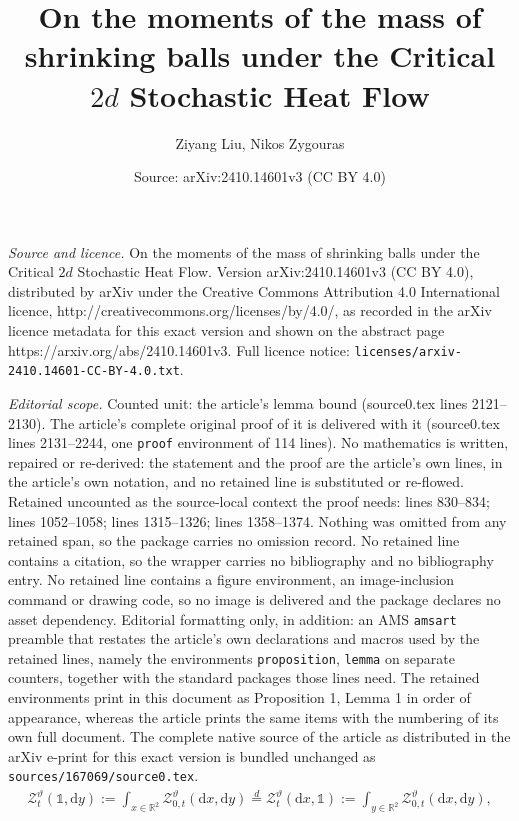 \documentclass[10pt,a4paper]{amsart}
\title{On the moments of the mass of shrinking balls under the Critical $2d$ Stochastic Heat Flow}
\author{Ziyang Liu, Nikos Zygouras}
\date{Source: arXiv:2410.14601v3 (CC BY 4.0)}
\newcommand{\R}{\mathbb{R}}
\newcommand\dd{\mathrm{d}}
\newcommand{\ind}{\mathds{1}}
\renewcommand{\theta}{\vartheta}
\begin{document}
\maketitle

\noindent\emph{Source and licence.} On the moments of the mass of shrinking balls under the Critical $2d$ Stochastic Heat Flow. Version arXiv:2410.14601v3 (CC BY 4.0), distributed by arXiv under the Creative Commons Attribution 4.0 International licence, http://creativecommons.org/licenses/by/4.0/, as recorded in the arXiv licence metadata for this exact version and shown on the abstract page https://arxiv.org/abs/2410.14601v3. Full licence notice: \texttt{licenses/arxiv-2410.14601-CC-BY-4.0.txt}.\par\smallskip

\noindent\textit{Editorial scope.} Counted unit: the article's lemma bound (source0.tex lines 2121--2130). The article's complete original proof of it is delivered with it (source0.tex lines 2131--2244, one \texttt{proof} environment of 114 lines). No mathematics is written, repaired or re-derived: the statement and the proof are the article's own lines, in the article's own notation, and no retained line is substituted or re-flowed.  Retained uncounted as the source-local context the proof needs: lines 830--834; lines 1052--1058; lines 1315--1326; lines 1358--1374.  Nothing was omitted from any retained span, so the package carries no omission record.  No retained line contains a citation, so the wrapper carries no bibliography and no bibliography entry.  No retained line contains a figure environment, an image-inclusion command or drawing code, so no image is delivered and the package declares no asset dependency.  Editorial formatting only, in addition: an AMS \texttt{amsart} preamble that restates the article's own declarations and macros used by the retained lines, namely the environments \texttt{proposition}, \texttt{lemma} on separate counters, together with the standard packages those lines need.  The retained environments print in this document as Proposition 1, Lemma 1 in order of appearance, whereas the article prints the same items with the numbering of its own full document.  The complete native source of the article as distributed in the arXiv e-print for this exact version is bundled unchanged as \texttt{sources/167069/source0.tex}.
\begin{align}\label{one-time}
\mathscr{Z}_t^\theta(\ind, \dd y):=\int_{x\in \R^2} \mathscr{Z}_{0,t}^\theta(\dd x, \dd y)
 \stackrel{d}{=}
 \mathscr{Z}_t^\theta(\dd x, \ind):=\int_{y\in \R^2} \mathscr{Z}_{0,t}^\theta(\dd x, \dd y),
\end{align}
\end{document}
